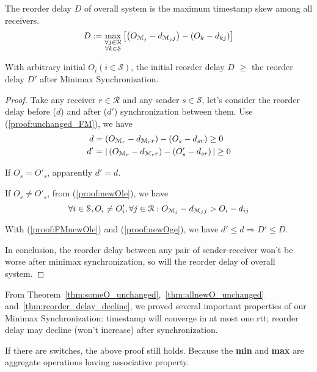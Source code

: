 \begin{definition}
	The reorder delay $D$ of overall system is the maximum timestamp skew among all receivers.
	\begin{equation*}
		D:=\max_{\substack{\forall j \in \mathcal{R}\\\forall k \in \mathcal{S}}}\left[\left({O_{{\mathcal{M}_{j}}}-d_{{{\mathcal{M}_{j}}}{j}}}\right)-\left({O_{k}-d_{{k}{j}}}\right)\right]
	\end{equation*}
\end{definition}
\begin{theorem}\label{thm:reorder_delay_decline}
	With arbitrary initial $O_i(i\in \mathcal{S})$, the initial reorder delay $D$ $\ge$ the reorder delay $D'$ after Minimax Synchronization.
\end{theorem}
\begin{proof}
		Take any receiver $r \in \mathcal{R}$ and any sender $s \in \mathcal{S}$, let's consider the reorder delay before ($d$) and after ($d'$) synchronization between them.
		Use (\ref{proof:unchanged_FM}), we have
	\begin{equation*}\begin{split}
		 d &=\left({O_{{\mathcal{M}_{r}}}-d_{{{\mathcal{M}_{r}}}{r}}}\right)-\left({O_{s}-d_{{s}{r}}}\right) \ge 0\\ d'&=|\left({O_{{\mathcal{M}_{r}}}-d_{{{\mathcal{M}_{r}}}{r}}}\right)-\left(O'_s - d_{sr}\right)| \ge 0
	\end{split}\end{equation*}
	
	If $O_s = O'_s$, apparently $d'=d$.
	
	If $O_s \neq O'_s$, from (\ref{proof:newOle}), we have
	$$\forall i \in \mathcal{S}, O_i \neq O'_i, \forall j \in \mathcal{R}:{O_{{\mathcal{M}_{j}}}-d_{{{\mathcal{M}_{j}}}{j}}} > {O_{i}-d_{{i}{j}}}$$
	
	With (\ref{proof:FMnewOle}) and (\ref{proof:newOge}), we have $d' \le d \Rightarrow D' \le D$.
	
	In conclusion, the reorder delay between any pair of sender-receiver won't be worse after minimax synchronization, so will the reorder delay of overall system.
\end{proof}
\begin{rem}
	From Theorem~\ref{thm:someO_unchanged},~\ref{thm:allnewO_unchanged} and~\ref{thm:reorder_delay_decline}, we proved several important properties of our Minimax Synchronization:
	timestamp will converge in at most one rtt; reorder delay may decline (won't increase) after synchronization.
\end{rem}
\begin{note}
	If there are switches, the above proof still holds.
	Because the \textbf{min} and \textbf{max} are aggregate operations having associative property.
\end{note}

